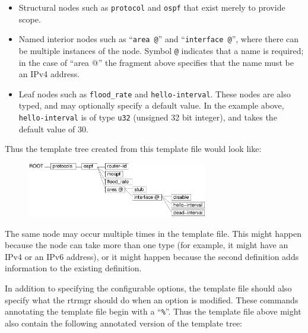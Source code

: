 \documentclass[11pt]{article}
\begin{document}
\begin{itemize}

  \item Structural nodes such as {\tt protocol} and {\tt ospf} that exist
merely to provide scope.

  \item Named interior nodes such as ``{\tt area @}'' and
``{\tt interface @}'', where there can be multiple instances of the node.
Symbol {\tt @} indicates that a name is required; in the case of ``area @''
the fragment above specifies that the name must be an IPv4 address.

  \item Leaf nodes such as  {\tt flood\_rate} and
{\tt hello-interval}.  These nodes are also typed, and may optionally
specify a default value.  In the example above, {\tt hello-interval} is
of type {\tt u32} (unsigned 32 bit integer), and takes the default value of
30.

\end{itemize}

Thus the template tree created from this template file would look like:

\begin{figure}[htb]
\centerline{\includegraphics[width=0.7\textwidth]{figs/template}}
\vspace{.05in}
\end{figure}

The same node may occur multiple times in the template file.  This
might happen because the node can take more than one type (for
example, it might have an IPv4 or an IPv6 address), or it might happen
because the second definition adds information to the existing
definition.

In addition to specifying the configurable options, the template file
should also specify what the rtrmgr should do when an option is
modified.  These commands annotating the template file begin with a
``{\tt \%}''.  Thus the template file above might also contain the
following annotated version of the template tree:
\end{document}
